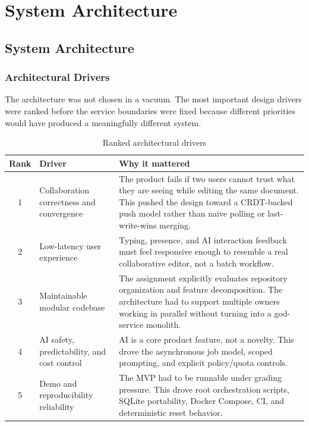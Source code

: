 \part{System Architecture}

\chapter{System Architecture}

\section{Architectural Drivers}

The architecture was not chosen in a vacuum. The most important design drivers were ranked before the
service boundaries were fixed because different priorities would have produced a meaningfully different
system.

\begin{table}[H]
\centering
\caption{Ranked architectural drivers}
\label{tab:architectural-drivers}
\begin{tabularx}{\textwidth}{c p{4.2cm} X}
\toprule
\textbf{Rank} & \textbf{Driver} & \textbf{Why it mattered} \\
\midrule
1 & Collaboration correctness and convergence & The product fails if two users cannot trust what they are seeing while editing the same document. This pushed the design toward a CRDT-backed push model rather than naive polling or last-write-wins merging. \\
2 & Low-latency user experience & Typing, presence, and AI interaction feedback must feel responsive enough to resemble a real collaborative editor, not a batch workflow. \\
3 & Maintainable modular codebase & The assignment explicitly evaluates repository organization and feature decomposition. The architecture had to support multiple owners working in parallel without turning into a god-service monolith. \\
4 & AI safety, predictability, and cost control & AI is a core product feature, not a novelty. This drove the asynchronous job model, scoped prompting, and explicit policy/quota controls. \\
5 & Demo and reproducibility reliability & The MVP had to be runnable under grading pressure. This drove root orchestration scripts, SQLite portability, Docker Compose, CI, and deterministic reset behavior. \\
\bottomrule
\end{tabularx}
\end{table}

